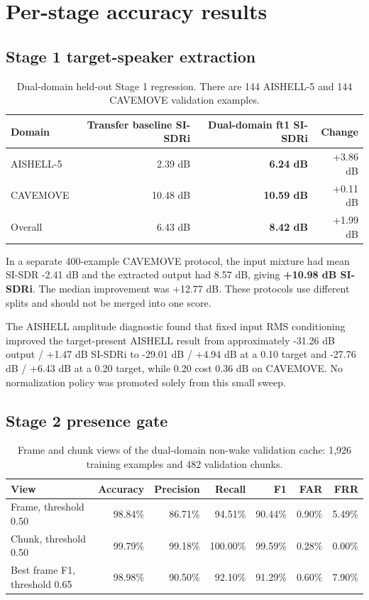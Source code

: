 \documentclass[11pt,a4paper]{article}
\newcommand{\metric}[1]{\textbf{#1}}
\begin{document}
\section{Per-stage accuracy results}

\subsection{Stage 1 target-speaker extraction}

\begin{table}[H]
\centering
\caption{Dual-domain held-out Stage 1 regression. There are 144 AISHELL-5
and 144 CAVEMOVE validation examples.}
\label{tab:stage1}
\small
\begin{tabular}{@{}lrrr@{}}
\toprule
\textbf{Domain} & \textbf{Transfer baseline SI-SDRi} & \textbf{Dual-domain ft1 SI-SDRi} & \textbf{Change}\\
\midrule
AISHELL-5 & 2.39 dB & \textbf{6.24 dB} & +3.86 dB\\
CAVEMOVE & 10.48 dB & \textbf{10.59 dB} & +0.11 dB\\
Overall & 6.43 dB & \textbf{8.42 dB} & +1.99 dB\\
\bottomrule
\end{tabular}
\end{table}

In a separate 400-example CAVEMOVE protocol, the input mixture had mean
SI-SDR -2.41 dB and the extracted output had 8.57 dB, giving
\metric{+10.98 dB SI-SDRi}. The median improvement was +12.77 dB. These
protocols use different splits and should not be merged into one score.

The AISHELL amplitude diagnostic found that fixed input RMS conditioning
improved the target-present AISHELL result from approximately -31.26 dB
output / +1.47 dB SI-SDRi to -29.01 dB / +4.94 dB at a 0.10 target and
-27.76 dB / +6.43 dB at a 0.20 target, while 0.20 cost 0.36 dB on CAVEMOVE.
No normalization policy was promoted solely from this small sweep.

\subsection{Stage 2 presence gate}

\begin{table}[H]
\centering
\caption{Frame and chunk views of the dual-domain non-wake validation cache:
1,926 training examples and 482 validation chunks.}
\label{tab:presence}
\small
\begin{tabular}{@{}lrrrrrr@{}}
\toprule
\textbf{View} & \textbf{Accuracy} & \textbf{Precision} & \textbf{Recall} & \textbf{F1} & \textbf{FAR} & \textbf{FRR}\\
\midrule
Frame, threshold 0.50 & 98.84\% & 86.71\% & 94.51\% & 90.44\% & 0.90\% & 5.49\%\\
Chunk, threshold 0.50 & 99.79\% & 99.18\% & 100.00\% & 99.59\% & 0.28\% & 0.00\%\\
Best frame F1, threshold 0.65 & 98.98\% & 90.50\% & 92.10\% & 91.29\% & 0.60\% & 7.90\%\\
\bottomrule
\end{tabular}
\end{table}
\end{document}
